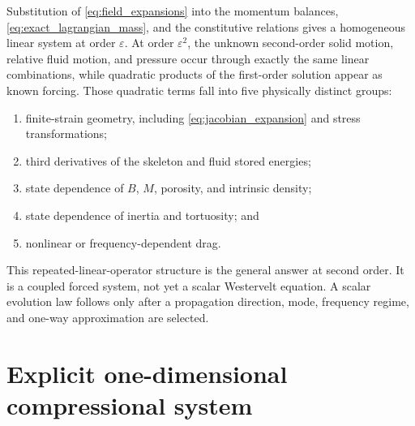 \documentclass[11pt]{article}
\begin{document}
Substitution of \eqref{eq:field_expansions} into the momentum balances,
\eqref{eq:exact_lagrangian_mass}, and the constitutive relations gives a
homogeneous linear system at order \(\varepsilon\).  At order
\(\varepsilon^2\), the unknown second-order solid motion, relative fluid
motion, and pressure occur through exactly the same linear combinations, while
quadratic products of the first-order solution appear as known forcing.  Those
quadratic terms fall into five physically distinct groups:
\begin{enumerate}[leftmargin=2em]
    \item finite-strain geometry, including \eqref{eq:jacobian_expansion} and
    stress transformations;
    \item third derivatives of the skeleton and fluid stored energies;
    \item state dependence of \(B\), \(M\), porosity, and intrinsic density;
    \item state dependence of inertia and tortuosity; and
    \item nonlinear or frequency-dependent drag.
\end{enumerate}
This repeated-linear-operator structure is the general answer at second order.
It is a coupled forced system, not yet a scalar Westervelt equation.  A scalar
evolution law follows only after a propagation direction, mode, frequency
regime, and one-way approximation are selected.

\section{Explicit one-dimensional compressional system}
\end{document}
